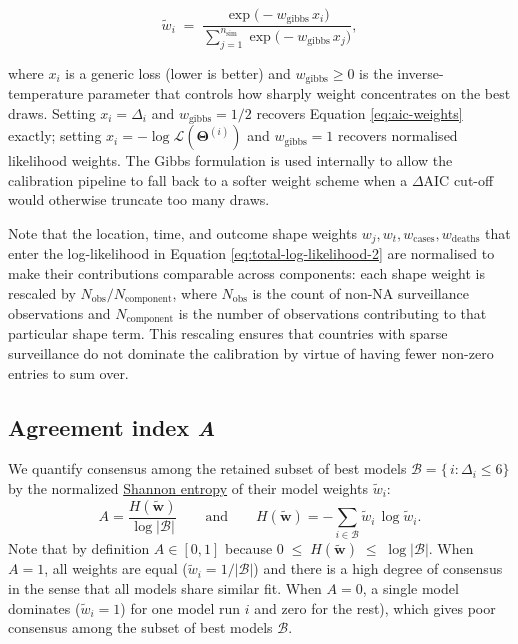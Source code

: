\documentclass[
]{book}
\begin{document}
\begin{equation}
\tilde{w}_i \;=\; \frac{\exp\!\big(-w_{\text{gibbs}}\, x_i\big)}{\sum_{j=1}^{n_{\text{sim}}} \exp\!\big(-w_{\text{gibbs}}\, x_j\big)},
\label{eq:gibbs-weights}
\end{equation}

where \(x_i\) is a generic loss (lower is better) and \(w_{\text{gibbs}} \ge 0\) is the inverse-temperature parameter that controls how sharply weight concentrates on the best draws. Setting \(x_i = \Delta_i\) and \(w_{\text{gibbs}} = 1/2\) recovers Equation \eqref{eq:aic-weights} exactly; setting \(x_i = -\log\mathcal{L}(\boldsymbol{\Theta}^{(i)})\) and \(w_{\text{gibbs}} = 1\) recovers normalised likelihood weights. The Gibbs formulation is used internally to allow the calibration pipeline to fall back to a softer weight scheme when a \(\Delta\text{AIC}\) cut-off would otherwise truncate too many draws.

Note that the location, time, and outcome shape weights \(w_j, w_t, w_{\text{cases}}, w_{\text{deaths}}\) that enter the log-likelihood in Equation \eqref{eq:total-log-likelihood-2} are normalised to make their contributions comparable across components: each shape weight is rescaled by \(N_{\text{obs}} / N_{\text{component}}\), where \(N_{\text{obs}}\) is the count of non-NA surveillance observations and \(N_{\text{component}}\) is the number of observations contributing to that particular shape term. This rescaling ensures that countries with sparse surveillance do not dominate the calibration by virtue of having fewer non-zero entries to sum over.

\subsection{\texorpdfstring{Agreement index \emph{A}}{Agreement index A}}\label{agreement-index-a}

We quantify consensus among the retained subset of best models \(\mathcal B = \{\,i : \Delta_i \le 6\}\) by the normalized \href{https://en.wikipedia.org/wiki/Entropy_(information_theory)}{Shannon entropy} of their model weights \(\tilde w_i\):
\begin{equation}
A = 
\frac{H(\mathbf{\tilde{w}})}{\log|\mathcal B|}
\qquad \text{and} \qquad
H(\mathbf{\tilde{w}})
=
-\sum_{i\in\mathcal B}\tilde w_i\,\log\tilde w_i.
\label{eq:agreement}
\end{equation}
Note that by definition \(A \in [0,1]\) because \(0 \;\le\; H(\mathbf{\tilde{w}})\;\le\;\log|\mathcal B|\). When \(A=1\), all weights are equal (\(\tilde w_i = 1/|\mathcal B|\)) and there is a high degree of consensus in the sense that all models share similar fit. When \(A=0\), a single model dominates (\(\tilde w_i = 1\)) for one model run \(i\) and zero for the rest), which gives poor consensus among the subset of best models \(\mathcal B\).
\end{document}
